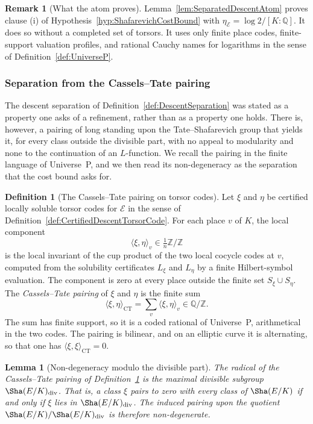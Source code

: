 \documentclass[10pt, reqno]{amsart}
\theoremstyle{plain}
\newtheorem{lemma}[theorem]{Lemma}
\theoremstyle{definition}
\newtheorem{definition}[theorem]{Definition}
\newtheorem{remark}[theorem]{Remark}
\theoremstyle{plain}
\newcommand{\Q}{\mathbb{Q}}
\newcommand{\Z}{\mathbb{Z}}
\begin{document}
\begin{remark}[What the atom proves]
\label{rem:AtomProvesFirstClause}
Lemma~\ref{lem:SeparatedDescentAtom} proves clause \textup{(i)} of Hypothesis~\ref{hyp:ShafarevichCostBound} with $\eta_{\mathcal{E}}=\log 2/[K:\Q]$. It does so without a completed set of torsors. It uses only finite place codes, finite-support valuation profiles, and rational Cauchy names for logarithms in the sense of Definition~\ref{def:UniverseP}.
\end{remark}

\subsubsection{Separation from the Cassels--Tate pairing}
\label{subsubsec:CasselsTateSeparation}

The descent separation of Definition~\ref{def:DescentSeparation} was stated as a property one asks of a refinement, rather than as a property one holds. There is, however, a pairing of long standing upon the Tate--Shafarevich group that yields it, for every class outside the divisible part, with no appeal to modularity and none to the continuation of an $L$-function. We recall the pairing in the finite language of Universe~P, and we then read its non-degeneracy as the separation that the cost bound asks for.

\begin{definition}[The Cassels--Tate pairing on torsor codes]
\label{def:CasselsTatePairingCode}
Let $\xi$ and $\eta$ be certified locally soluble torsor codes for $\mathcal{E}$ in the sense of Definition~\ref{def:CertifiedDescentTorsorCode}. For each place $v$ of $K$, the local component
\[
  \langle \xi,\eta\rangle_{v}
  \in
  \tfrac{1}{n}\Z/\Z
\]
is the local invariant of the cup product of the two local cocycle codes at $v$, computed from the solubility certificates $L_{\xi}$ and $L_{\eta}$ by a finite Hilbert-symbol evaluation. The component is zero at every place outside the finite set $S_{\xi}\cup S_{\eta}$. The \emph{Cassels--Tate pairing} of $\xi$ and $\eta$ is the finite sum
\[
  \langle \xi,\eta\rangle_{\mathrm{CT}}
  =
  \sum_{v} \langle \xi,\eta\rangle_{v}
  \in
  \Q/\Z.
\]
The sum has finite support, so it is a coded rational of Universe~P, arithmetical in the two codes. The pairing is bilinear, and on an elliptic curve it is alternating, so that one has $\langle\xi,\xi\rangle_{\mathrm{CT}}=0$.
\end{definition}

\begin{lemma}[Non-degeneracy modulo the divisible part]
\label{lem:CasselsTateNondegeneracy}
The radical of the Cassels--Tate pairing of Definition~\ref{def:CasselsTatePairingCode} is the maximal divisible subgroup $\Sha(E/K)_{\mathrm{div}}$. That is, a class $\xi$ pairs to zero with every class of $\Sha(E/K)$ if and only if $\xi$ lies in $\Sha(E/K)_{\mathrm{div}}$. The induced pairing upon the quotient $\Sha(E/K)/\Sha(E/K)_{\mathrm{div}}$ is therefore non-degenerate.
\end{lemma}
\end{document}
